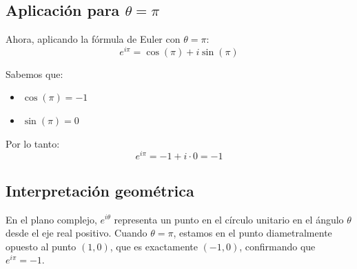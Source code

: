 \subsection{Aplicación para $\theta = \pi$}

Ahora, aplicando la fórmula de Euler con $\theta = \pi$:
\begin{equation}
e^{i\pi} = \cos(\pi) + i\sin(\pi)
\end{equation}

Sabemos que:
\begin{itemize}
\item $\cos(\pi) = -1$
\item $\sin(\pi) = 0$
\end{itemize}

Por lo tanto:
\begin{equation}
e^{i\pi} = -1 + i \cdot 0 = -1
\end{equation}

\subsection{Interpretación geométrica}

En el plano complejo, $e^{i\theta}$ representa un punto en el círculo unitario en el ángulo $\theta$ desde el eje real positivo. Cuando $\theta = \pi$, estamos en el punto diametralmente opuesto al punto $(1,0)$, que es exactamente $(-1,0)$, confirmando que $e^{i\pi} = -1$.

\begin{center}
\end{center}
